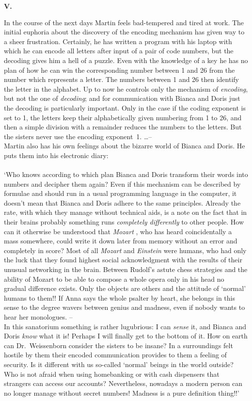 \begin{center} 
{\bf V.} 
\end{center} 
In the course of the next days Martin feels bad-tempered and tired at work. 
The initial euphoria about the discovery of the encoding mechanism has given way to a sheer frustration. 
Certainly, he has written a program with his laptop with which he can encode all letters after input of a 
pair of code numbers, but the decoding gives him a hell of a puzzle. 
Even with the knowledge of a key he has no plan of how he can win the corresponding number between 1 and 26 
from the number which represents a letter. The numbers between 1 and 26 then identify the letter in the alphabet.
Up to now he controls only the mechanism of {\em encoding\/}, but not the one of {\em decoding\/}; and for 
communication with Bianca and Doris just the decoding is particularly important. 
Only in the case if the coding exponent is set to 1, the letters keep their alphabetically given numbering from 
1 to 26, and then a simple division with a remainder reduces the numbers to the letters. 
But the sisters never use the encoding exponent~1. \dots -- \\ 
Martin also has his own feelings about the bizarre world of Bianca and Doris. 
He puts them into his electronic diary: \\ \\ 
`Who knows according to which plan Bianca and Doris transform their words into numbers and decipher them again?
Even if this mechanism can be described by formulae and should run in a usual programming language in the 
computer, it doesn't mean that Bianca and Doris adhere to the same principles. 
Already the rate, with which they manage without technical aids, is a note on the fact that in their
brains probably something runs {\em completely differently \/} to other people. 
How can it otherwise be understood that {\em Mozart \/}, who has heard coincidentally a mass somewhere, could 
write it down later from memory without an error and completely in score? 
Most of all {\em Mozart \/} and {\em Einstein \/} were humans, who had only the luck that they found highest 
social acknowledgment with the results of their unusual networking in the brain. 
Between Rudolf's astute chess strategies and the ability of Mozart to be able to compose a whole opera only 
in his head no gradual difference exists. 
Only the objects are others and the attitude of `normal' humans to them!! 
If Anna says the whole psalter by heart, she belongs in this sense to the degree wavers between genius and 
madness, even if nobody wants to hear her monologues. -- \\ 
In this sanatorium something is rather lugubrious: I can {\em sense\/} it, and Bianca and Doris {\em know\/} 
what it is! 
Perhaps I will finally get to the bottom of it. 
How on earth can Dr.~Weissenborn consider the sisters to be  insane? 
In a surroundings felt hostile by them their encoded communication provides to them a feeling of security. 
Is it different with us so-called `normal' beings in the world outside?
Who is not afraid when using homebanking or with cash dispensers that strangers can access our accounts? 
Nevertheless, nowadays a modern person can no longer manage without secret numbers! 
Madness is a pure definition thing!!'

